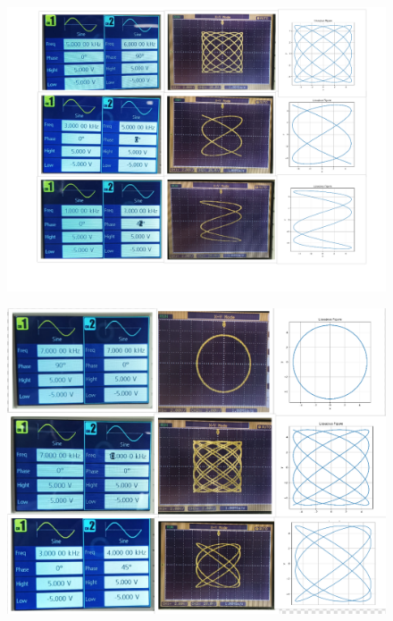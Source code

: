 \documentclass[report]{IEEEtran}
\begin{document}
\begin{figure}[h]
    \centering
    \begin{minipage}{\textwidth}
        \centering
        \includegraphics[width=\columnwidth]{Fig2.png}
        \label{fig:Plot2}
    \end{minipage}

    \vspace{0.5cm} %

    \begin{minipage}{\textwidth}
        \centering
        \includegraphics[width=\columnwidth]{Fig3.png}
        \label{fig:Plot3}
    \end{minipage}
\end{figure}
\end{document}
